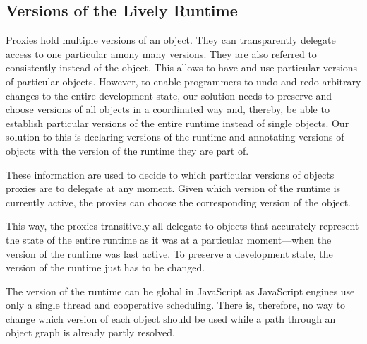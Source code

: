 \subsection{Versions of the Lively Runtime} %

Proxies hold multiple versions of an object.
They can transparently delegate access to one particular amony many versions.
They are also referred to consistently instead of the object.
This allows to have and use particular versions of particular objects.
However, to enable programmers to undo and redo arbitrary changes to the entire development state, our solution needs to preserve and choose versions of all objects in a coordinated way and, thereby, be able to establish particular versions of the entire runtime instead of single objects.
Our solution to this is declaring versions of the runtime and annotating versions of objects with the version of the runtime they are part of.

These information are used to decide to which particular versions of objects proxies are to delegate at any moment.
Given which version of the runtime is currently active, the proxies can choose the corresponding version of the object.


This way, the proxies transitively all delegate to objects that accurately represent the state of the entire runtime as it was at a particular moment---when the version of the runtime was last active.
To preserve a development state, the version of the runtime just has to be changed.




The version of the runtime can be global in JavaScript as JavaScript engines use only a single thread and cooperative scheduling.
There is, therefore, no way to change which version of each object should be used while a path through an object graph is already partly resolved.
